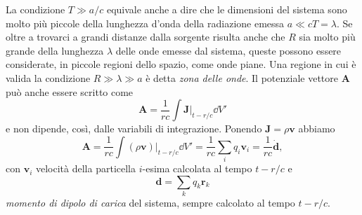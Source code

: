 La condizione $T \gg a/c$ equivale anche a dire che le dimensioni del sistema
sono molto più piccole della lunghezza d'onda della radiazione emessa
$a \ll cT = \lambda$.  Se oltre a trovarci a grandi distanze dalla sorgente
risulta anche che $R$ sia molto più grande della lunghezza $\lambda$ delle onde
emesse dal sistema, queste possono essere considerate, in piccole regioni dello
spazio, come onde piane.  Una regione in cui è valida la condizione
$R \gg \lambda \gg a$ è detta \emph{zona delle onde}.
Il potenziale vettore $\bm{A}$ può anche essere scritto come
\begin{equation}
  \bm{A} = \frac{1}{rc} \int \bm{J}|_{t-r/c} \dd V'
\end{equation}
e non dipende, così, dalle variabili di integrazione.  Ponendo
$\bm{J} = \rho \bm{v}$ abbiamo
\begin{equation}
  \bm{A} = \frac{1}{rc} \int (\rho\bm{v})|_{t-r/c} \dd V' = \frac{1}{rc}
  \sum_{i} q_{i}\bm{v}_{i} = \frac{1}{rc} \dot{\bm{d}},
\end{equation}
con $\bm{v}_{i}$ velocità della particella $i$-esima calcolata al tempo
$t-r/c$ e
\begin{equation}
  \bm{d} = \sum_{k} q_{k} \bm{r}_{k}
\end{equation}
\emph{momento di dipolo di carica} del
sistema, sempre calcolato al tempo $t-r/c$.

